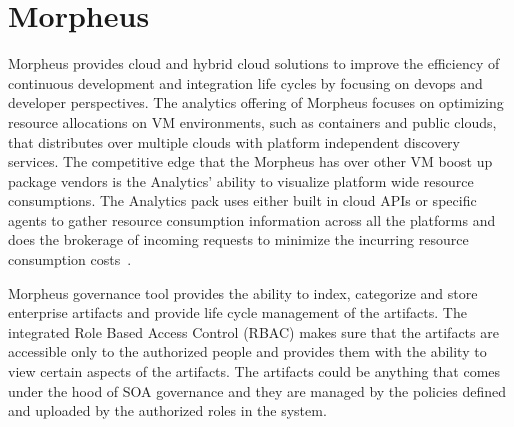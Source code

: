 \section{Morpheus}

Morpheus provides cloud and hybrid cloud solutions to improve the efficiency of
continuous development and integration life cycles by focusing on devops and
developer perspectives. The analytics offering of Morpheus focuses on 
optimizing resource allocations on VM environments, such as containers and 
public clouds, that distributes over multiple clouds with platform independent 
discovery services. The competitive edge that the Morpheus has over other VM 
boost up package vendors is the Analytics’ ability to visualize platform wide 
resource consumptions. The Analytics pack uses either built in cloud APIs or 
specific agents to gather resource consumption information across all the 
platforms and does the brokerage of incoming requests to minimize the incurring 
resource consumption costs~\cite{hid-sp18-416-www-morpheus-product-guide}.

Morpheus governance tool provides the ability to index, categorize and store 
enterprise artifacts and provide life cycle management of the artifacts. The 
integrated Role Based Access Control (RBAC) makes sure that the artifacts are 
accessible only to the authorized people and provides them with the ability to 
view certain aspects of the artifacts. The artifacts could be anything that 
comes under the hood of SOA governance 
\cite{hid-sp18-416-www-soa-governance-wikipedia} and they are managed by the 
policies defined and uploaded by the authorized roles in the system.